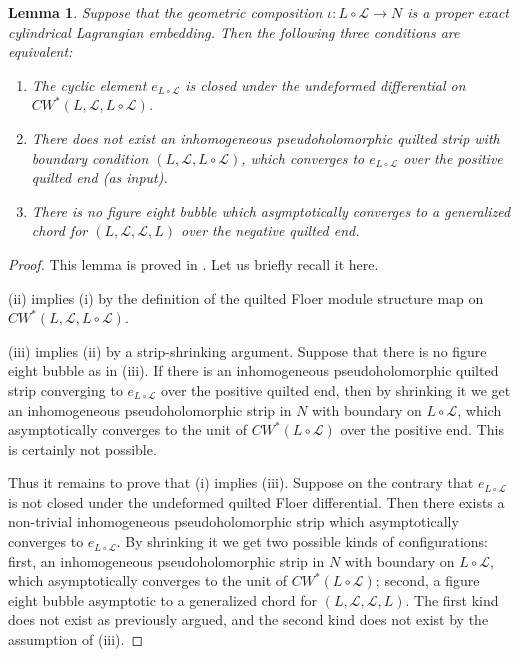 \documentclass{amsart}
\newtheorem{lemma}[theorem]{Lemma}
\numberwithin{equation}{section}
\numberwithin{figure}{section}
\begin{document}
\begin{lemma}\label{equivalent conditions for closedness of the cyclic element}
	Suppose that the geometric composition $\iota: L \circ \mathcal{L} \to N$ is a proper exact cylindrical Lagrangian embedding. Then the following three conditions are equivalent:
\begin{enumerate}[label=(\roman*)]

\item The cyclic element $e_{L \circ \mathcal{L}}$ is closed under the undeformed differential on $CW^{*}(L, \mathcal{L}, L \circ \mathcal{L})$.

\item There does not exist an inhomogeneous pseudoholomorphic quilted strip with boundary condition $(L, \mathcal{L}, L \circ \mathcal{L})$, which converges to $e_{L \circ \mathcal{L}}$ over the positive quilted end (as input).

\item There is no figure eight bubble which asymptotically converges to a generalized chord for $(L, \mathcal{L}, \mathcal{L}, L)$ over the negative quilted end.

\end{enumerate}
\end{lemma}
\begin{proof}
	This lemma is proved in \cite{Gao1}. Let us briefly recall it here. \par
	(ii) implies (i) by the definition of the quilted Floer module structure map on $CW^{*}(L, \mathcal{L}, L \circ \mathcal{L})$. \par
	(iii) implies (ii) by a strip-shrinking argument. Suppose that there is no figure eight bubble as in (iii). If there is an inhomogeneous pseudoholomorphic quilted strip converging to $e_{L \circ \mathcal{L}}$ over the positive quilted end, then by shrinking it we get an inhomogeneous pseudoholomorphic strip in $N$ with boundary on $L \circ \mathcal{L}$, which asymptotically converges to the unit of $CW^{*}(L \circ \mathcal{L})$ over the positive end. This is certainly not possible. \par
	Thus it remains to prove that (i) implies (iii). Suppose on the contrary that $e_{L \circ \mathcal{L}}$ is not closed under the undeformed quilted Floer differential. Then there exists a non-trivial inhomogeneous pseudoholomorphic strip which asymptotically converges to $e_{L \circ \mathcal{L}}$.
By shrinking it we get two possible kinds of configurations: first, an inhomogeneous pseudoholomorphic strip in $N$ with boundary on $L \circ \mathcal{L}$, which asymptotically converges to the unit of $CW^{*}(L \circ \mathcal{L})$;
second, a figure eight bubble asymptotic to a generalized chord for $(L, \mathcal{L}, \mathcal{L}, L)$. The first kind does not exist as previously argued, and the second kind does not exist by the assumption of (iii). \par
\end{proof}
\end{document}
